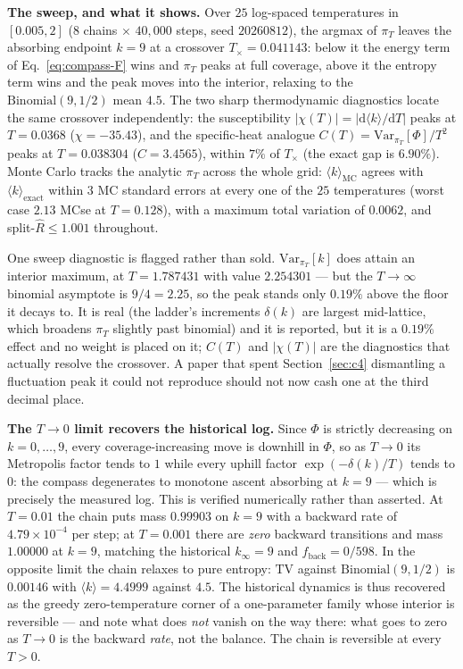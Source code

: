 \documentclass[11pt,a4paper]{article}
\theoremstyle{plain}
\theoremstyle{remark}
\theoremstyle{plain}
\begin{document}
\textbf{The sweep, and what it shows.} Over $25$ log-spaced temperatures in
$[0.005,2]$ ($8$ chains $\times$ $40{,}000$ steps, seed $20260812$), the argmax of
$\pi_T$ leaves the absorbing endpoint $k=9$ at a crossover
$T_\times=0.041143$: below it the energy term of Eq.~\eqref{eq:compass-F} wins and
$\pi_T$ peaks at full coverage, above it the entropy term wins and the peak moves
into the interior, relaxing to the $\mathrm{Binomial}(9,1/2)$ mean $4.5$. The two
sharp thermodynamic diagnostics locate the same crossover independently: the
susceptibility $|\chi(T)|=|\mathrm{d}\langle k\rangle/\mathrm{d}T|$ peaks at
$T=0.0368$ ($\chi=-35.43$), and the specific-heat analogue
$C(T)=\mathrm{Var}_{\pi_T}[\Phi]/T^2$ peaks at $T=0.038304$ ($C=3.4565$), within
$7\%$ of $T_\times$ (the exact gap is $6.90\%$). Monte Carlo tracks the analytic $\pi_T$ across the whole
grid: $\langle k\rangle_{\mathrm{MC}}$ agrees with $\langle k\rangle_{\mathrm{exact}}$
within $3$ MC standard errors at every one of the $25$ temperatures (worst case
$2.13$ MCse at $T=0.128$), with a maximum total variation of $0.0062$, and
split-$\hat R\le1.001$ throughout.

One sweep diagnostic is flagged rather than sold. $\mathrm{Var}_{\pi_T}[k]$ does
attain an interior maximum, at $T=1.787431$ with value $2.254301$ --- but the
$T\to\infty$ binomial asymptote is $9/4=2.25$, so the peak stands only $0.19\%$
above the floor it decays to. It is real (the ladder's increments $\delta(k)$ are
largest mid-lattice, which broadens $\pi_T$ slightly past binomial) and it is
reported, but it is a $0.19\%$ effect and no weight is placed on it; $C(T)$ and
$|\chi(T)|$ are the diagnostics that actually resolve the crossover. A paper that
spent Section~\ref{sec:c4} dismantling a fluctuation peak it could not reproduce
should not now cash one at the third decimal place.

\textbf{The $T\to0$ limit recovers the historical log.} Since $\Phi$ is strictly
decreasing on $k=0,\dots,9$, every coverage-increasing move is downhill in
$\Phi$, so as $T\to0$ its Metropolis factor tends to $1$ while every uphill factor
$\exp(-\delta(k)/T)$ tends to $0$: the compass degenerates to monotone ascent
absorbing at $k=9$ --- which is precisely the measured log. This is verified
numerically rather than asserted. At $T=0.01$ the chain puts mass $0.99903$ on
$k=9$ with a backward rate of $4.79\times10^{-4}$ per step; at $T=0.001$ there are
\emph{zero} backward transitions and mass $1.00000$ at $k=9$, matching the
historical $k_\infty=9$ and $f_{\mathrm{back}}=0/598$. In the opposite limit the
chain relaxes to pure entropy: $\mathrm{TV}$ against $\mathrm{Binomial}(9,1/2)$ is
$0.00146$ with $\langle k\rangle=4.4999$ against $4.5$. The historical dynamics is
thus recovered as the greedy zero-temperature corner of a one-parameter family
whose interior is reversible --- and note what does \emph{not} vanish on the way
there: what goes to zero as $T\to0$ is the backward \emph{rate}, not the balance.
The chain is reversible at every $T>0$.
\end{document}
